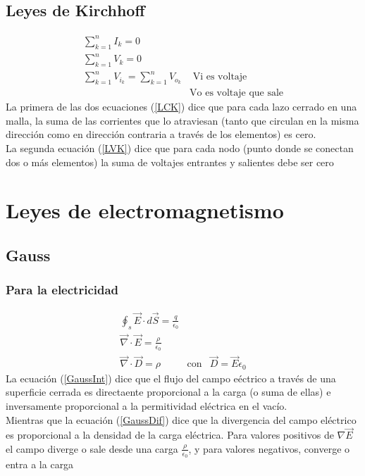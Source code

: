\documentclass[12pt,spanish,lettersize,twocolumn]{article}
\begin{document}
\subsection{Leyes de Kirchhoff}
\begin{eqnarray}
\sum\limits_{k=1}^{n} I_{k} = 0\label{LCK}\\
\sum\limits_{k=1}^{n} V_{k} = 0\label{LVK}\\
\sum\limits_{k=1}^{n} V_{i_k} = \sum\limits_{k=1}^{n} V_{o_k} & \textrm{ Vi es voltaje}\\
\nonumber & \textrm{Vo es voltaje que sale}
\end{eqnarray}
La primera de las dos ecuaciones (\ref{LCK}) dice que para cada lazo cerrado en una malla, la suma de las corrientes que lo atraviesan (tanto que circulan en la misma direcci\'on como en direcci\'on contraria a trav\'es de los elementos) es cero.\\
La segunda ecuaci\'on (\ref{LVK}) dice que para cada nodo (punto donde se conectan dos o m\'as elementos) la suma de voltajes entrantes y salientes debe ser cero

\section{Leyes de electromagnetismo}

\subsection{Gauss}

\subsubsection{Para la electricidad}
\begin{eqnarray}
\oint_{s}\overrightarrow{E}\cdot d\overrightarrow{S}=\frac{q}{\epsilon_0}\label{GaussInt}\\
\overrightarrow{\nabla}\cdot\overrightarrow{E}=\frac{\rho}{\epsilon_0}\label{GaussDif}\\
\nonumber \overrightarrow{\nabla}\cdot\overrightarrow{D}= \rho & \textrm{con} & \overrightarrow{D} = \overrightarrow{E}\epsilon_0
\end{eqnarray}
La ecuaci\'on (\ref{GaussInt}) dice que el flujo del campo e\'ectrico a trav\'es de una superficie cerrada es directaente proporcional a la carga (o suma de ellas) e inversamente proporcional a la permitividad el\'ectrica en el vac\'io.\\
Mientras que la ecuaci\'on (\ref{GaussDif}) dice que la divergencia del campo el\'ectrico es proporcional a la densidad de la carga el\'ectrica. Para valores positivos de $\nabla\overrightarrow{E}$ el campo diverge o sale desde una carga $\frac{\rho}{\epsilon_0}$, y para valores negativos, converge o entra a la carga
\end{document}
